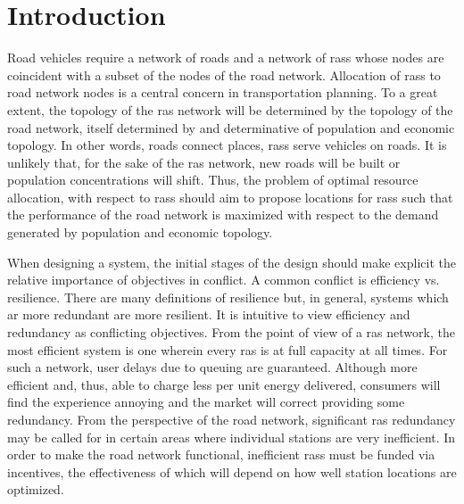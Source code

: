 \section{Introduction}

Road vehicles require a network of roads and a network of \glspl{ras} whose nodes are coincident with a subset of the nodes of the road network. Allocation of \glspl{ras} to road network nodes is a central concern in transportation planning. To a great extent, the topology of the \gls{ras} network will be determined by the topology of the road network, itself determined by and determinative of population and economic topology. In other words, roads connect places, \glspl{ras} serve vehicles on roads. It is unlikely that, for the sake of the \gls{ras} network, new roads will be built or population concentrations will shift. Thus, the problem of optimal resource allocation, with respect to \glspl{ras} should aim to propose locations for \glspl{ras} such that the performance of the road network is maximized with respect to the demand generated by population and economic topology.

When designing a system, the initial stages of the design should make explicit the relative importance of objectives in conflict. A common conflict is efficiency vs. resilience. There are many definitions of resilience but, in general, systems which ar more redundant are more resilient. It is intuitive to view efficiency and redundancy as conflicting objectives. From the point of view of a \gls{ras} network, the most efficient system is one wherein every \gls{ras} is at full capacity at all times. For such a network, user delays due to queuing are guaranteed. Although more efficient and, thus, able to charge less per unit energy delivered, consumers will find the experience annoying and the market will correct providing some redundancy. From the perspective of the road network, significant \gls{ras} redundancy may be called for in certain areas where individual stations are very inefficient. In order to make the road network functional, inefficient \glspl{ras} must be funded via incentives, the effectiveness of which will depend on how well station locations are optimized.


